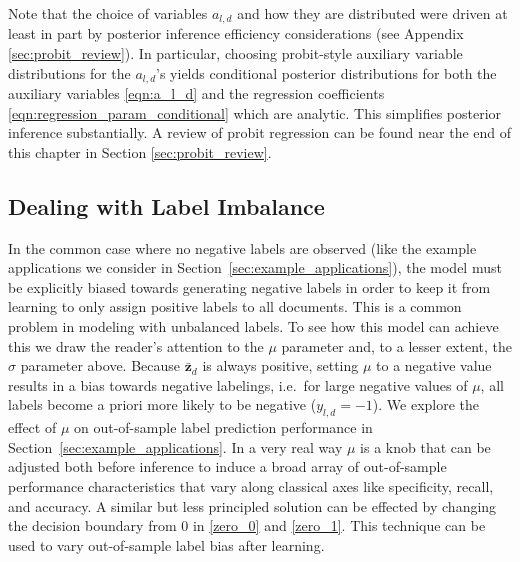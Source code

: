 Note that the choice of variables $a_{l,d}$ and how they are distributed were  driven at least in part by posterior inference efficiency considerations (see Appendix \ref{sec:probit_review}).  In particular, choosing probit-style auxiliary variable distributions for the $a_{l,d}$'s  yields conditional posterior distributions for both the auxiliary variables \eqref{eqn:a_l_d} and the regression coefficients \eqref{eqn:regression_param_conditional} which are analytic.  This simplifies posterior inference substantially.  A review of probit regression can be found near the end of this chapter in Section \ref{sec:probit_review}.



\subsection{Dealing with Label Imbalance}

In the common case where no negative labels are observed (like the example applications we consider in Section~\ref{sec:example_applications}), the model must be explicitly biased towards generating  negative labels in order to keep it from learning to only assign positive labels to all documents.   This is a common problem in modeling with unbalanced labels.  To see how this model can achieve this we draw the reader's attention to the $\mu$ parameter and, to a lesser extent, the $\sigma$ parameter above.  Because $\bar{\mathbf{z}}_d$ is always positive, setting $\mu$ to a negative value results in a bias towards negative labelings, i.e.~for large negative values of $\mu$, all labels become a priori more likely to be negative ($y_{l,d}=-1$).  We explore the effect of $\mu$ on out-of-sample label prediction performance in Section~\ref{sec:example_applications}.   In a very real way $\mu$ is a knob that can be adjusted both before inference to induce a broad array of out-of-sample performance characteristics that vary along classical axes like specificity, recall, and accuracy.  A similar but less principled solution can be effected by changing the decision boundary from $0$ in \eqref{zero_0} and \eqref{zero_1}.  This technique can be used to vary out-of-sample label bias after learning.


